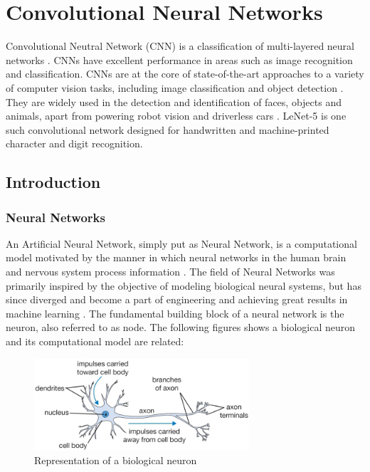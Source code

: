 \chapter{Convolutional Neural Networks}
\label{ch5_cnn}

Convolutional Neutral Network (CNN) is a classification of multi-layered neural networks \cite{cnn_lecun_lenet5}. CNNs have excellent performance in areas such as image recognition and classification.  CNNs are at the core of state-of-the-art approaches to a variety of computer vision tasks, including image classification \cite{kriz_suts_hinton_nips2012} and object detection \cite{gir_don_dar_mal_cvpr2014}. They are widely used in the detection and identification of faces, objects and animals, apart from powering robot vision and driverless cars \cite{cnn_karn}. LeNet-5 is one such convolutional network designed for handwritten and machine-printed character and digit recognition.

\section{Introduction}
\label{sect5_1}

\subsection{Neural Networks}
\label{sect5_1_1}
An Artificial Neural Network, simply put as Neural Network, is a computational model motivated by the manner in which neural networks in the human brain and nervous system process information \cite{cnn_karn}. The field of Neural Networks was primarily inspired by the objective of modeling biological neural systems, but has since diverged and become a part of engineering and achieving great results in machine learning \cite{nn_stanford_1}. \newline\newline The fundamental building block of a neural network is the neuron, also referred to as node. The following figures shows a biological neuron and its computational model are related: \newline

\begin{figure}[h!]
\centering
\includegraphics[width=8cm]{figures/neuron.png}
\caption{Representation of a biological neuron\cite{nn_stanford_1}}
\label{fig:cnn1}
\end{figure}

